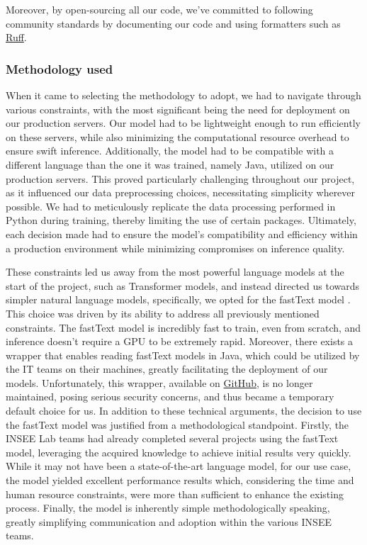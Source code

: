 Moreover, by open-sourcing all our code, we've committed to following community standards by documenting our code and using formatters such as \href{https://github.com/astral-sh/ruff}{Ruff}.


\subsubsection{Methodology used}

When it came to selecting the methodology to adopt, we had to navigate through various constraints, with the most significant being the need for deployment on our production servers. Our model had to be lightweight enough to run efficiently on these servers, while also minimizing the computational resource overhead to ensure swift inference. Additionally, the model had to be compatible with a different language than the one it was trained, namely Java, utilized on our production servers. This proved particularly challenging throughout our project, as it influenced our data preprocessing choices, necessitating simplicity wherever possible. We had to meticulously replicate the data processing performed in Python during training, thereby limiting the use of certain packages. Ultimately, each decision made had to ensure the model's compatibility and efficiency within a production environment while minimizing compromises on inference quality.

These constraints led us away from the most powerful language models at the start of the project, such as Transformer models, and instead directed us towards simpler natural language models, specifically, we opted for the fastText model \cite{joulin2016bag}. This choice was driven by its ability to address all previously mentioned constraints. The fastText model is incredibly fast to train, even from scratch, and inference doesn't require a GPU to be extremely rapid. Moreover, there exists a wrapper that enables reading fastText models in Java, which could be utilized by the IT teams on their machines, greatly facilitating the deployment of our models. Unfortunately, this wrapper, available on \href{https://github.com/vinhkhuc/JFastText}{GitHub}, is no longer maintained, posing serious security concerns, and thus became a temporary default choice for us. In addition to these technical arguments, the decision to use the fastText model was justified from a methodological standpoint. Firstly, the INSEE Lab teams had already completed several projects using the fastText model, leveraging the acquired knowledge to achieve initial results very quickly. While it may not have been a state-of-the-art language model, for our use case, the model yielded excellent performance results which, considering the time and human resource constraints, were more than sufficient to enhance the existing process. Finally, the model is inherently simple methodologically speaking, greatly simplifying communication and adoption within the various INSEE teams. 

